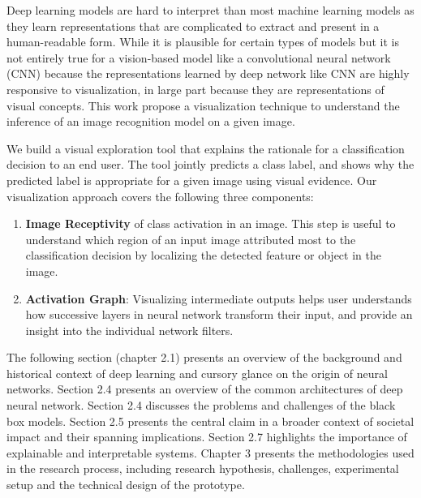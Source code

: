 Deep learning models are hard to interpret than most machine learning models as they learn representations that are complicated to extract and present in a human-readable form.  While it is plausible for certain types of models but it is  not entirely true for a vision-based model like a convolutional neural network (CNN) because the representations learned by deep network like CNN are highly responsive to visualization, in large part because they are representations of visual concepts. This work propose a visualization technique to understand the inference of an image recognition model on a given image. 

We build a visual exploration tool that explains the rationale for a classification decision to an end user. The tool jointly predicts a class label,  and shows why the predicted label is appropriate for a given image using visual evidence. Our visualization approach covers the following three components:

\begin{enumerate}
\item \textbf{Image Receptivity} of class activation in an image. This step is useful to understand which region of an input image attributed most to the classification decision by localizing the detected feature or object in the image.


\item  \textbf{Activation Graph}: Visualizing intermediate outputs helps user understands how successive layers in neural network transform their input, and provide an insight into the individual network filters.

\end{enumerate}

The following section (chapter 2.1) presents an overview of the background and historical context of deep learning and cursory glance on the origin of neural networks.  Section 2.4 presents an overview of the common architectures of deep neural network.  Section 2.4 discusses the problems and challenges of the black box models. Section 2.5 presents the central claim in a broader context of societal impact and their spanning implications. Section 2.7 highlights the importance of explainable and interpretable systems.  Chapter 3 presents the methodologies used in the research process, including research hypothesis, challenges, experimental setup and the technical design of the prototype.

